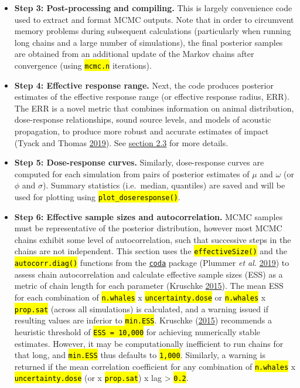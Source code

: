 \documentclass[
]{article}
\begin{document}
\begin{itemize}
\item
  \textbf{Step 3: Post-processing and compiling.} This is largely convenience code used to extract and format MCMC outputs. Note that in order to circumvent memory problems during subsequent calculations (particularly when running long chains and a large number of simulations), the final posterior samples are obtained from an additional update of the Markov chains after convergence (using \textcolor{codecolor}{\texttt{\hl{mcmc.n}}} iterations).
\item
  \textbf{Step 4: Effective response range.} Next, the code produces posterior estimates of the effective response range (or effective response radius, ERR). The ERR is a novel metric that combines information on animal distribution, dose-response relationships, sound source levels, and models of acoustic propagation, to produce more robust and accurate estimates of impact (Tyack and Thomas \protect\hyperlink{ref-Tyack2019}{2019}). See \hyperlink{err}{section 2.3} for more details.
\item
  \textbf{Step 5: Dose-response curves.} Similarly, dose-response curves are computed for each simulation from pairs of posterior estimates of \(\mu\) and \(\omega\) (or \(\phi\) and \(\sigma\)). Summary statistics (i.e.~median, quantiles) are saved and will be used for plotting using \textcolor{codecolor}{\texttt{\hl{plot\_doseresponse()}}}.
\item
  \textbf{Step 6: Effective sample sizes and autocorrelation.} MCMC samples must be representative of the posterior distribution, however most MCMC chains exhibit some level of autocorrelation, such that successive steps in the chains are not independent. This section uses the \textcolor{codecolor}{\texttt{\hl{effectiveSize()}}} and the \textcolor{codecolor}{\texttt{\hl{autocorr.diag()}}} functions from the \href{https://cran.r-project.org/web/packages/coda/index.html}{\texttt{coda}} package (Plummer \emph{et al.} \protect\hyperlink{ref-Plummer2019b}{2019}) to assess chain autocorrelation and calculate effective sample sizes (ESS) as a metric of chain length for each parameter (Kruschke \protect\hyperlink{ref-Kruschke2010}{2015}). The mean ESS for each combination of \textcolor{codecolor}{\texttt{\hl{n.whales}}} x \textcolor{codecolor}{\texttt{\hl{uncertainty.dose}}} or \textcolor{codecolor}{\texttt{\hl{n.whales}}} x \textcolor{codecolor}{\texttt{\hl{prop.sat}}} (across all simulations) is calculated, and a warning issued if resulting values are inferior to \textcolor{codecolor}{\texttt{\hl{min.ESS}}}. Kruschke (\protect\hyperlink{ref-Kruschke2010}{2015}) recommends a heuristic threshold of \textcolor{codecolor}{\texttt{\hl{ESS = 10,000}}} for achieving numerically stable estimates. However, it may be computationally inefficient to run chains for that long, and \textcolor{codecolor}{\texttt{\hl{min.ESS}}} thus defaults to \textcolor{codecolor}{\texttt{\hl{1,000}}}. Similarly, a warning is returned if the mean correlation coefficient for any combination of \textcolor{codecolor}{\texttt{\hl{n.whales}}} x \textcolor{codecolor}{\texttt{\hl{uncertainty.dose}}} (or x \textcolor{codecolor}{\texttt{\hl{prop.sat}}}) x lag \textgreater{} \textcolor{codecolor}{\texttt{\hl{0.2}}}.

\end{itemize}
\end{document}
